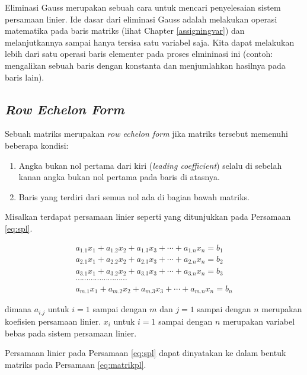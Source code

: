 \documentclass[
]{book}
\providecommand{\tightlist}{%
  \setlength{\itemsep}{0pt}\setlength{\parskip}{0pt}}
\theoremstyle{definition}
\theoremstyle{definition}
\theoremstyle{definition}
\theoremstyle{definition}
\theoremstyle{remark}
\begin{document}
Eliminasi Gauss merupakan sebuah cara untuk mencari penyelesaian sistem persamaan linier. Ide dasar dari eliminasi Gauss adalah melakukan operasi matematika pada baris matriks (lihat Chapter \ref{assigningvar}) dan melanjutkannya sampai hanya tersisa satu variabel saja. Kita dapat melakukan lebih dari satu operasi baris elementer pada proses elmininasi ini (contoh: mengalikan sebuah baris dengan konstanta dan menjumlahkan hasilnya pada baris lain).

\hypertarget{rowechelonform}{%
\subsection{\texorpdfstring{\emph{Row Echelon Form}}{Row Echelon Form}}\label{rowechelonform}}

Sebuah matriks merupakan \emph{row echelon form} jika matriks tersebut memenuhi beberapa kondisi:

\begin{enumerate}
\def\labelenumi{\arabic{enumi}.}
\tightlist
\item
  Angka bukan nol pertama dari kiri (\emph{leading coefficient}) selalu di sebelah kanan angka bukan nol pertama pada baris di atasnya.
\item
  Baris yang terdiri dari semua nol ada di bagian bawah matriks.
\end{enumerate}

Misalkan terdapat persamaan linier seperti yang ditunjukkan pada Persamaan \eqref{eq:spl}.

\begin{equation}
\begin{matrix}
  a_{1.1}x_1+a_{1.2}x_2+a_{1.3}x_3+\cdots+a_{1.n}x_n=b_1 \\
  a_{2.1}x_1+a_{2.2}x_2+a_{2.3}x_3+\cdots+a_{2.n}x_n=b_2 \\
  a_{3.1}x_1+a_{3.2}x_2+a_{3.3}x_3+\cdots+a_{3.n}x_n=b_3 \\
  \cdots\cdots\cdots\cdots\cdots\cdots\cdots\cdots       \\
  a_{m.1}x_1+a_{m.2}x_2+a_{m.3}x_3+\cdots+a_{m.n}x_n=b_n
 \end{matrix}
  \label{eq:spl}
\end{equation}

dimana \(a_{i.j}\) untuk \(i=1\) sampai dengan \(m\) dan \(j=1\) sampai dengan \(n\) merupakan koefisien persamaan linier. \(x_i\) untuk \(i=1\) sampai dengan \(n\) merupakan variabel bebas pada sistem persamaan linier.

Persamaan linier pada Persamaan \eqref{eq:spl} dapat dinyatakan ke dalam bentuk matriks pada Persamaan \eqref{eq:matrikpl}.
\end{document}

